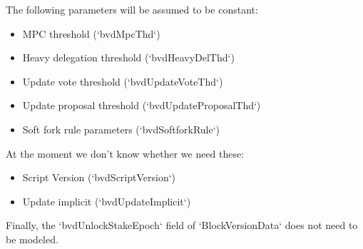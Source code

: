 The following parameters will be assumed to be constant:
\begin{itemize}
\item MPC threshold (`bvdMpcThd`)
\item Heavy delegation threshold (`bvdHeavyDelThd`)
\item Update vote threshold (`bvdUpdateVoteThd`)
\item Update proposal threshold (`bvdUpdateProposalThd`)
\item Soft fork rule parameters (`bvdSoftforkRule`)
\end{itemize}

At the moment we don't know whether we need these:

\begin{itemize}
\item Script Version (`bvdScriptVersion`)
\item Update implicit (`bvdUpdateImplicit`)
\end{itemize}

Finally, the `bvdUnlockStakeEpoch` field of `BlockVersionData` does not need to
be modeled.
